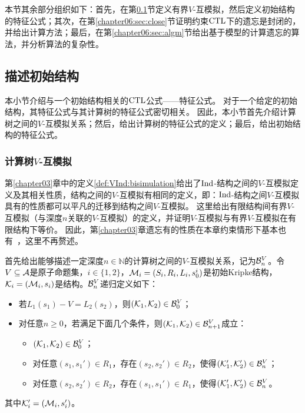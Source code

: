 本节其余部分组织如下：首先，在第\ref{chapter06:sec:des}节定义有界$V$-互模拟，然后定义初始结构的特征公式；其次，在第\ref{chapter06:sec:close}节证明约束$\textrm{CTL}$下的遗忘是封闭的，并给出计算方法；最后，在第\ref{chapter06:sec:algm}节给出基于模型的计算遗忘的算法，并分析算法的复杂性。


\subsection{描述初始结构}\label{chapter06:sec:des}%
本小节介绍与一个初始结构相关的$\textrm{CTL}$公式——特征公式。
对于一个给定的初始结构，其特征公式与其计算树的特征公式密切相关。
因此，本小节首先介绍计算树之间的$V$-互模拟关系；然后，给出计算树的特征公式的定义；最后，给出初始结构的特征公式。

\subsubsection{计算树$V$-互模拟}
第\ref{chapter03}章中的定义\ref{def:VInd:bisimulation}给出了$\textrm{Ind}$-结构之间的$V$-互模拟定义及其相关性质，结构之间的$V$-互模拟有相同的定义，即：$\textrm{Ind}$-结构之间$V$-互模拟具有的性质都可以平凡的迁移到结构之间$V$-互模拟。
这里给出有限结构间有界$V$-互模拟（与深度$n$关联的$V$-互模拟）的定义，并证明$V$-互模拟与有界$V$-互模拟在有限结构下等价。
因此，第\ref{chapter03}章遗忘有的性质在本章约束情形下基本也有~\cite{renyansfirstpaper}，这里不再赘述。

首先给出能够描述一定深度$n\in \mathbb{N}$的计算树之间的$V$-互模拟关系，记为${\cal B}_n^V$。令$V\subseteq {\cal A}$是原子命题集，$i\in \{1,2\}$，${\cal M}_i=(S_i,R_i,L_i,s_0^i)$是初始Kripke结构，${\cal K}_i=({\cal M}_i, s_i)$是结构。${\cal B}_n^V$递归定义如下：
\begin{itemize}
	\item 若$L_1(s_1)-V=L_2(s_2)$，则$({\cal K}_1,{\cal K}_2) \in {\cal B}_0^V$；
	\item 对任意$n\ge 0$，若满足下面几个条件，则$({\cal K}_1,{\cal K}_2)\in {\cal B}_{n+1}^V$成立：
	\begin{itemize}
		\item $({\cal K}_1,{\cal K}_2) \in {\cal B}_0^V$；
		\item 对任意$(s_1,s_1')\in R_1$，存在$(s_2,s_2')\in R_2$，使得$({\cal K}_1',{\cal K}_2') \in {\cal B}_n^V$；
		\item 对任意$(s_2,s_2')\in R_2$，存在$(s_1,s_1')\in R_1$，使得$({\cal K}_1',{\cal K}_2') \in {\cal B}_n^V$。
	\end{itemize}
\end{itemize}
其中${\cal K}_i'=({\cal M}_i,s_i')$。

